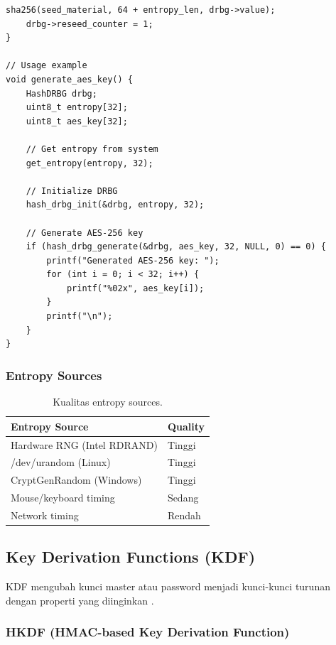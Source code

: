 \begin{lstlisting}[style=cstyle, caption={CSPRNG Implementation}]
    sha256(seed_material, 64 + entropy_len, drbg->value);
    drbg->reseed_counter = 1;
}

// Usage example
void generate_aes_key() {
    HashDRBG drbg;
    uint8_t entropy[32];
    uint8_t aes_key[32];
    
    // Get entropy from system
    get_entropy(entropy, 32);
    
    // Initialize DRBG
    hash_drbg_init(&drbg, entropy, 32);
    
    // Generate AES-256 key
    if (hash_drbg_generate(&drbg, aes_key, 32, NULL, 0) == 0) {
        printf("Generated AES-256 key: ");
        for (int i = 0; i < 32; i++) {
            printf("%02x", aes_key[i]);
        }
        printf("\n");
    }
}
\end{lstlisting}

\subsubsection{Entropy Sources}

\begin{table}[htbp]
  \centering
  \small
  \begin{tabular}{ll}
    \toprule
    Entropy Source & Quality \\
    \midrule
    Hardware RNG (Intel RDRAND) & Tinggi \\
    /dev/urandom (Linux) & Tinggi \\
    CryptGenRandom (Windows) & Tinggi \\
    Mouse/keyboard timing & Sedang \\
    Network timing & Rendah \\
    \bottomrule
  \end{tabular}
  \caption{Kualitas entropy sources.}
\end{table}

\subsection{Key Derivation Functions (KDF)}

KDF mengubah kunci master atau password menjadi kunci-kunci turunan dengan properti yang diinginkan \cite{nist800_108}.

\subsubsection{HKDF (HMAC-based Key Derivation Function)}


